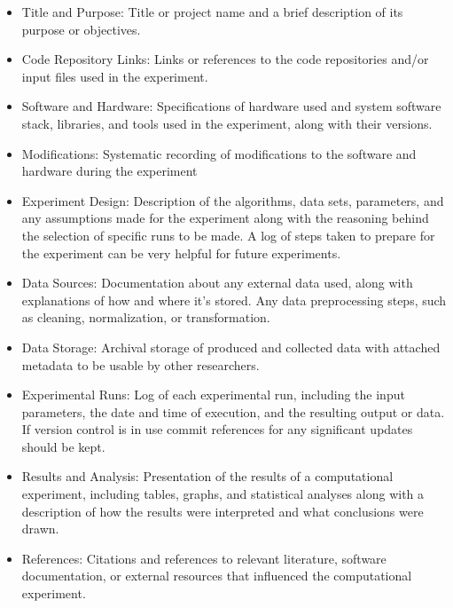 \documentclass{IEEEcsmag}
\begin{document}
\begin{itemize}
\item Title and Purpose: Title or project name and a brief description of its purpose or objectives.
\item Code Repository Links: Links or references to the code
repositories and/or input files used in the experiment.
\item  Software and Hardware: Specifications of hardware used and
system software stack, libraries, and tools used in the experiment,
along with their versions.
\item Modifications: Systematic recording of modifications to the software and
hardware during the experiment
\item Experiment Design: Description of the algorithms, data sets,
parameters, and any assumptions made for the experiment along with the
reasoning behind the selection of specific runs to be made. A log of steps
taken to prepare for the experiment can be very helpful for future experiments.
\item Data Sources: Documentation about any external data used, along with
explanations of how and where it's stored. Any data preprocessing
steps, such as cleaning, normalization, or transformation.
\item  Data Storage: Archival storage of produced and collected data with attached
metadata to be usable by other researchers.  
\item Experimental Runs: Log of each experimental run, including the
input parameters, the date and time of execution, and the resulting
output or data. If version control is in use commit references for any significant updates should
be kept.
\item Results and Analysis: Presentation of the results of
a computational experiment, including tables, graphs, and statistical
analyses along with a  description of how the results were interpreted and what conclusions were drawn.
\item References: Citations and references to relevant literature,
software documentation, or external resources that influenced the computational experiment.
\end{itemize}
\end{document}
